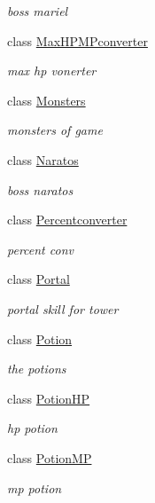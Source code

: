 \begin{DoxyCompactItemize}
\begin{DoxyCompactList}\small\item\em boss mariel \end{DoxyCompactList}\item 
class \hyperlink{class_lightdeath_1_1_max_h_p_m_pconverter}{Max\+H\+P\+M\+Pconverter}
\begin{DoxyCompactList}\small\item\em max hp vonerter \end{DoxyCompactList}\item 
class \hyperlink{class_lightdeath_1_1_monsters}{Monsters}
\begin{DoxyCompactList}\small\item\em monsters of game \end{DoxyCompactList}\item 
class \hyperlink{class_lightdeath_1_1_naratos}{Naratos}
\begin{DoxyCompactList}\small\item\em boss naratos \end{DoxyCompactList}\item 
class \hyperlink{class_lightdeath_1_1_percentconverter}{Percentconverter}
\begin{DoxyCompactList}\small\item\em percent conv \end{DoxyCompactList}\item 
class \hyperlink{class_lightdeath_1_1_portal}{Portal}
\begin{DoxyCompactList}\small\item\em portal skill for tower \end{DoxyCompactList}\item 
class \hyperlink{class_lightdeath_1_1_potion}{Potion}
\begin{DoxyCompactList}\small\item\em the potions \end{DoxyCompactList}\item 
class \hyperlink{class_lightdeath_1_1_potion_h_p}{Potion\+HP}
\begin{DoxyCompactList}\small\item\em hp potion \end{DoxyCompactList}\item 
class \hyperlink{class_lightdeath_1_1_potion_m_p}{Potion\+MP}
\begin{DoxyCompactList}\small\item\em mp potion \end{DoxyCompactList}\item 

\end{DoxyCompactItemize}
